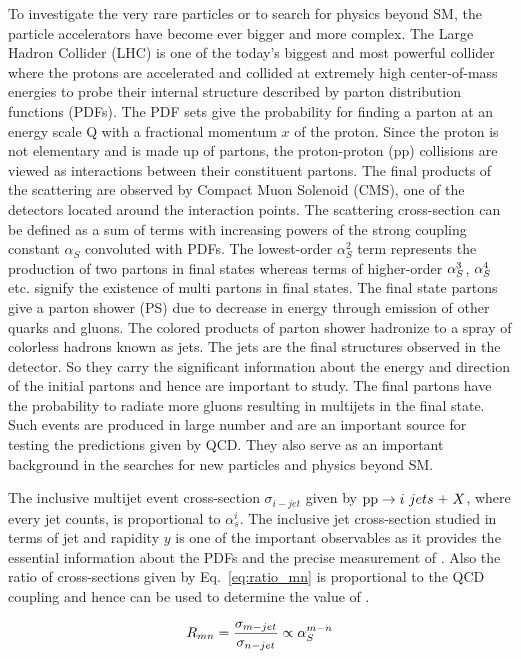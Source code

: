 To investigate the very rare particles or to search for physics beyond SM, the particle accelerators have become ever bigger and more complex. The Large Hadron Collider (LHC) is one of the today's biggest and most powerful collider where the protons are accelerated and collided at extremely high center-of-mass energies to probe their internal structure described by parton distribution functions (PDFs). The PDF sets give the probability for finding a parton at an energy scale Q with a fractional momentum $x$ of the proton. Since the proton is not elementary and is made up of partons, the proton-proton (pp) collisions are viewed as interactions between their constituent partons. The final products of the scattering are observed by Compact Muon Solenoid (CMS), one of the detectors located around the interaction points. The scattering cross-section can be defined as a sum of terms with increasing powers of the strong coupling constant $\alpha_{S}$ convoluted with PDFs. The lowest-order $\alpha_{S}^{2}$ term represents the production of two partons in final states whereas terms of higher-order $\alpha_S^3$, $\alpha_S^4$ etc. signify the existence of multi partons in final states. The final state partons give a parton shower (PS) due to decrease in energy through emission of other quarks and gluons. The colored products of parton shower hadronize to a spray of colorless hadrons known as jets. The jets are the final structures observed in the detector. So they carry the significant information about the energy and direction of the initial partons and hence are important to study. The final partons have the probability to radiate more gluons resulting in multijets in the final state. Such events are produced in large number and are an important source for testing the predictions given by QCD. They also serve as an important background in the searches for new particles and physics beyond SM. 

The inclusive multijet event cross-section $\sigma_{i-jet}$ given by ${{\rm pp}\to i~jets~\plus X}$, where every jet counts, is proportional to $\alpha^{i}_{s}$. The inclusive jet cross-section studied in terms of jet \pt and rapidity $y$ is one of the important observables as it provides the essential information about the PDFs and the precise measurement of \alps. Also the ratio of cross-sections given by Eq.~\ref{eq:ratio_mn} is proportional to the QCD coupling \alps and hence can be used to determine the value of \alps. 

\begin{equation}
R_{mn} = \frac{\sigma_{m-jet}}{\sigma_{n-jet}} \propto \alps^{m-n}
\label{eq:ratio_mn}
\end{equation}

